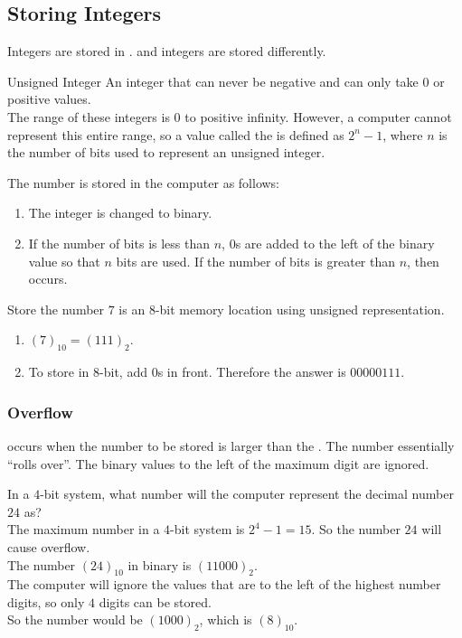 \documentclass[../notes.tex]{subfiles}
\begin{document}
			\subsection{Storing Integers}
				Integers are stored in .  and  integers are stored differently.
				\begin{definition}{Unsigned Integer}
					An integer that can never be negative and can only take $0$ or positive values.\\
					The range of these integers is $0$ to positive infinity. However, a computer cannot represent this entire range, so a value called the  is defined as $2^{n} - 1$, where $n$ is the number of bits used to represent an unsigned integer.
				\end{definition}
				The number is stored in the computer as follows:
				\begin{enumerate}
					\item The integer is changed to binary.
					\item If the number of bits is less than $n$, $0$s are added to the left of the binary value so that $n$ bits are used. If the number of bits is greater than $n$, then  occurs.
				\end{enumerate}
				\begin{example}
					Store the number $7$ is an $8$-bit memory location using unsigned representation.
					\begin{enumerate}
						\item $(7)_{10} = (111)_{2}$.
						\item To store in $8$-bit, add $0$s in front. Therefore the answer is $00000111$.
					\end{enumerate}
				\end{example}
				\subsubsection{Overflow}
					 occurs when the number to be stored is larger than the . The number essentially ``rolls over''. The binary values to the left of the maximum digit are ignored.
					\begin{example}
						In a $4$-bit system, what number will the computer represent the decimal number $24$ as?\\
						The maximum number in a $4$-bit system is $2^{4} - 1 = 15$. So the number $24$ will cause overflow.\\
						The number $(24)_{10}$ in binary is $(11000)_{2}$.\\
						The computer will ignore the values that are to the left of the highest number digits, so only $4$ digits can be stored.\\
						So the number would be $(1000)_{2}$, which is $(8)_{10}$.
					\end{example}
\end{document}
